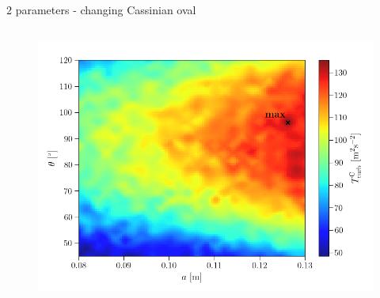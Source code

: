 \documentclass[aspectratio=169,xcolor=dvipsnames]{beamer}
\begin{document}
\begin{frame}{2 parameters - changing Cassinian oval}
	\begin{columns}
		\begin{column}{1\textwidth}
			\begin{figure}
				\includegraphics[width=0.68\linewidth, trim={0 0 0cm 9mm}, clip]{Images/cassini2Dinterpolated.png}		
			\end{figure}
		\end{column}
	\end{columns}	
\end{frame}
\end{document}
